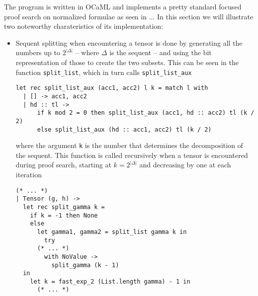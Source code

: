 \documentclass[a4paper, 12pt, tesi, english]{report}
\begin{document}
The program is written in OCaML and implements a pretty standard focused proof search on normalized formulae as seen in ...%
In this section we will illustrate two noteworthy charateristics of its implementation:
\begin{itemize}
	\item Sequent splitting when encountering a tensor is done by generating all the numbers up to $2^{|\Delta|}$ -- where $\Delta$ is the sequent -- and using the bit representation of those to create the two subsets.
		This can be seen in the function \texttt{split\_list}, which in turn calls \texttt{split\_list\_aux}
		\begin{lstlisting}[language=caml]
let rec split_list_aux (acc1, acc2) l k = match l with
  | [] -> acc1, acc2
  | hd :: tl -> 
      if k mod 2 = 0 then split_list_aux (acc1, hd :: acc2) tl (k / 2)
      else split_list_aux (hd :: acc1, acc2) tl (k / 2)
		\end{lstlisting}
		where the argument \texttt{k} is the number that determines the decomposition of the sequent.
		This function is called recursively when a tensor is encountered during proof search, starting at $ k = 2^{|\Delta|}$ and decreasing by one at each iteration
		\begin{lstlisting}[language=caml]
(* ... *)
| Tensor (g, h) ->
  let rec split_gamma k = 
    if k = -1 then None
    else
      let gamma1, gamma2 = split_list gamma k in
        try
	  (* ... *)
        with NoValue ->
          split_gamma (k - 1) 
  in
    let k = fast_exp_2 (List.length gamma) - 1 in
      (* ... *)
		\end{lstlisting}


\end{itemize}
\end{document}
